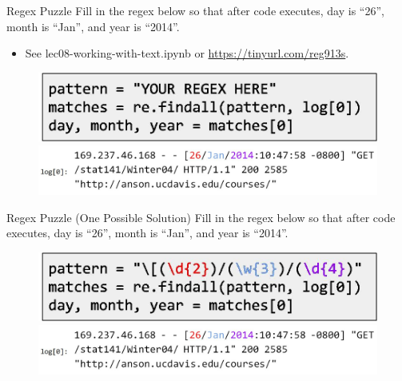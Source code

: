 \documentclass[aspectratio=169]{../latex_main/tntbeamer}  %
\begin{document}
	
	
	\begin{frame}{Regex Puzzle}
    	Fill in the regex below so that after code executes, day is “26”, month is “Jan”, and year is “2014”. 
    	\begin{itemize}
    	    \item See lec08-working-with-text.ipynb or \url{https://tinyurl.com/reg913s}.
    	\end{itemize}
    	\begin{figure}
    	    \centering
    	    \includegraphics[scale=.6]{Bild23}
    	    \includegraphics[scale=.4]{Bild27}
    	\end{figure}
	\end{frame}
	
	
	\begin{frame}{Regex Puzzle (One Possible Solution) }
    	Fill in the regex below so that after code executes, day is “26”, month is “Jan”, and year is “2014”. 
    	\begin{figure}
    	    \centering
    	    \includegraphics[scale=.6]{Bild24}
    	    \includegraphics[scale=.4]{Bild27}
    	\end{figure}
	\end{frame}
	
	
	
\end{document}
